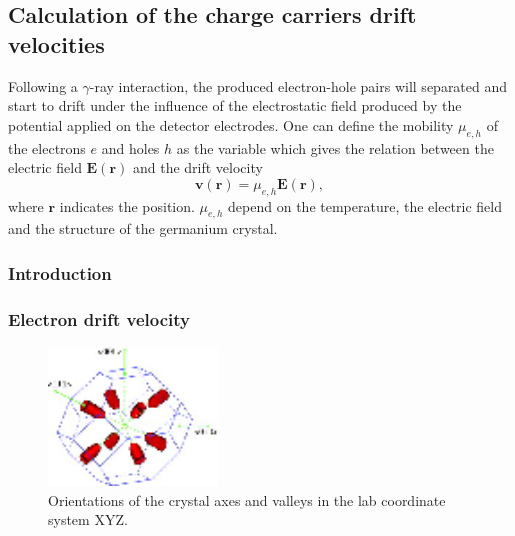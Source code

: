 \subsection{Calculation of the charge carriers drift velocities}
\label{sec:drift}
Following a $\gamma$-ray interaction, the produced electron-hole pairs will separated and start to drift under the influence of the electrostatic field produced by the potential applied on the detector electrodes. One can define the mobility $\mu_{e,h}$ of the electrons $e$ and holes $h$ as the variable which gives the relation between the electric field $\mathbf{E}(\mathbf{r})$ and the drift velocity
\begin{equation}
  \label{eq:mobi}
  \mathbf{v}(\mathbf{r}) = \mu_{e,h} \mathbf{E}(\mathbf{r}),
\end{equation}
where $\mathbf{r}$ indicates the position. $\mu_{e,h}$ depend on the temperature, the electric field and the structure of the germanium crystal.

\subsubsection{Introduction}
\label{sec:drin}

\subsubsection{Electron drift velocity}
\label{sec:elec}
\begin{figure}[tbhp]
  \centering
  \includegraphics[width=0.4\textwidth]{valleys.eps}  
  \caption{Orientations of the crystal axes and valleys in the lab coordinate system XYZ.}
  \label{fig:valley}
\end{figure}

